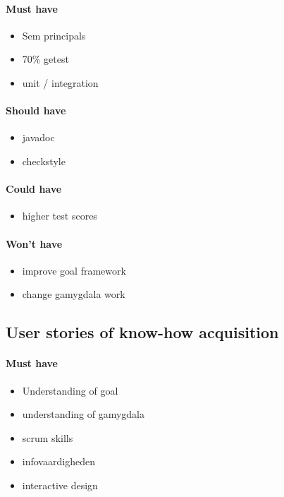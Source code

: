 \paragraph{Must have} 
\begin{itemize}
\item Sem principals
\item 70\% getest
\item unit / integration
\end{itemize}

\paragraph{Should have} 
\begin{itemize}
\item javadoc
\item checkstyle
\end{itemize}

\paragraph{Could have} 
\begin{itemize}
\item higher test scores
\end{itemize}

\paragraph{Won't have} 
\begin{itemize}
\item improve goal framework
\item change gamygdala work
\end{itemize}

\subsection{User stories of know-how acquisition}
\paragraph{Must have} 
\begin{itemize}
\item Understanding of goal
\item understanding of gamygdala
\item scrum skills
\item infovaardigheden
\item interactive design
\end{itemize}

